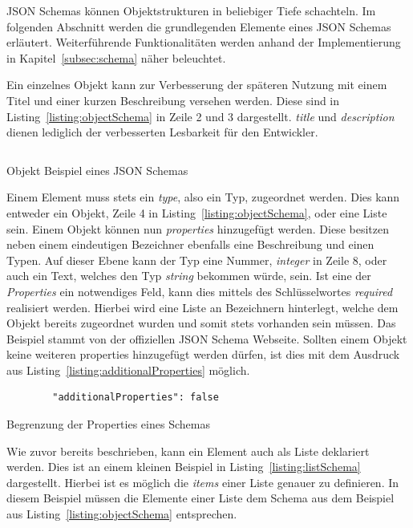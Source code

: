 JSON Schemas können Objektstrukturen in beliebiger Tiefe schachteln.
Im folgenden Abschnitt werden die grundlegenden Elemente eines JSON Schemas erläutert.
Weiterführende Funktionalitäten werden anhand der Implementierung in Kapitel~\ref{subsec:schema} näher beleuchtet.

Ein einzelnes Objekt kann zur Verbesserung der späteren Nutzung mit einem Titel und einer kurzen Beschreibung versehen werden.
Diese sind in Listing~\ref{listing:objectSchema} in Zeile 2 und 3 dargestellt.
\textit{title} und \textit{description} dienen lediglich der verbesserten Lesbarkeit für den Entwickler.

\begin{listing}[!ht]
    \inputminted{java}{listings/2.2.1/object.schema.json}
    \caption{Objekt Beispiel eines JSON Schemas}
    \label{listing:objectSchema}
\end{listing}

Einem Element muss stets ein \textit{type}, also ein Typ, zugeordnet werden.
Dies kann entweder ein Objekt, Zeile 4 in Listing~\ref{listing:objectSchema}, oder eine Liste sein.
Einem Objekt können nun \textit{properties} hinzugefügt werden.
Diese besitzen neben einem eindeutigen Bezeichner ebenfalls eine Beschreibung und einen Typen.
Auf dieser Ebene kann der Typ eine Nummer, \textit{integer} in Zeile 8, oder auch ein Text, welches den Typ \textit{string} bekommen würde, sein.
Ist eine der \textit{Properties} ein notwendiges Feld, kann dies mittels des Schlüsselwortes \textit{required} realisiert werden.
Hierbei wird eine Liste an Bezeichnern hinterlegt, welche dem Objekt bereits zugeordnet wurden und somit stets vorhanden sein müssen.
Das Beispiel stammt von der offiziellen JSON Schema Webseite.\cite*{schemaExample}
Sollten einem Objekt keine weiteren properties hinzugefügt werden dürfen, ist dies mit dem Ausdruck aus Listing~\ref{listing:additionalProperties} möglich.

\begin{listing}[!ht]
    \begin{verbatim}
        "additionalProperties": false
    \end{verbatim}
    \caption{Begrenzung der Properties eines Schemas}
    \label{listing:additionalProperties}
\end{listing}

Wie zuvor bereits beschrieben, kann ein Element auch als Liste deklariert werden.
Dies ist an einem kleinen Beispiel in Listing~\ref{listing:listSchema} dargestellt.
Hierbei ist es möglich die \textit{items} einer Liste genauer zu definieren.
In diesem Beispiel müssen die Elemente einer Liste dem Schema aus dem Beispiel aus Listing~\ref{listing:objectSchema} entsprechen.

